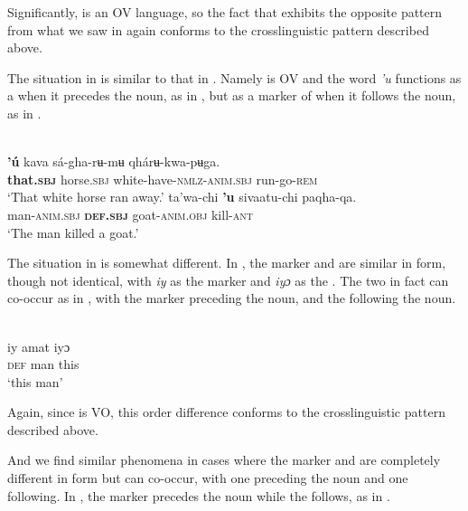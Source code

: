 \documentclass[output=paper]{langsci/langscibook}
\begin{document}
\noindent Significantly,  is an OV language, so the fact that  exhibits the opposite pattern from what we saw in  again conforms to the crosslinguistic pattern described above.

The situation in  is similar to that in . Namely  is OV and the word \textit{'u} functions as a  when it precedes the noun, as in , but as a marker of  when it follows the noun, as in .

\ea\label{ex:dryer:39}
\\
\ea\label{ex:dryer:39a}
\gll     \textbf{'ú}  kava  sá-gha-rʉ-mʉ  qhárʉ-kwa-pʉga.\\
         \textbf{that.\textsc{sbj}}  horse.\textsc{sbj}  white-have-\textsc{nmlz-anim.sbj}  run-go-\textsc{rem}\\
\glt     ‘That white horse ran away.’
\ex\label{ex:dryer:39b}
\gll    ta'wa-chi  \textbf{'u}  sivaatu-chi  paqha-qa.\\
         man-\textsc{anim.sbj}  \textbf{\textsc{def.sbj}}  goat-\textsc{anim.obj}  kill-\textsc{ant}\\
\glt     ‘The man killed a goat.’
\z
\z

The situation in  is somewhat different. In , the  marker and  are similar in form, though not identical, with \textit{iy} as the  marker and \textit{iyɔ} as the . The two in fact can co-occur as in , with the  marker preceding the noun, and the  following the noun.

\ea\label{ex:dryer:40}
\\
\gll   iy   amat   iyɔ\\
       \textsc{def}   man   this \\
\glt   ‘this man’
\z

\noindent Again, since  is VO, this order difference conforms to the crosslinguistic pattern described above.

And we find similar phenomena in cases where the  marker and  are completely different in form but can co-occur, with one preceding the noun and one following. In , the  marker precedes the noun while the  follows, as in .
\end{document}
